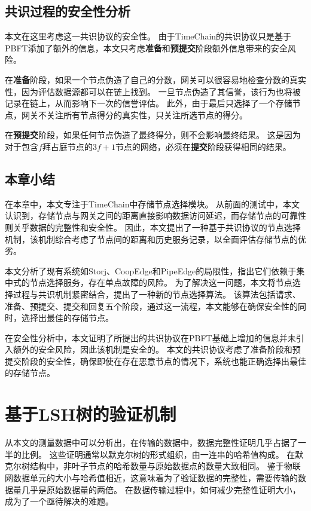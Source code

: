 \section{共识过程的安全性分析}
本文在这里考虑这一共识协议的安全性。
由于TimeChain的共识协议只是基于PBFT添加了额外的信息，本文只考虑\textbf{准备}和\textbf{预提交}阶段额外信息带来的安全风险。

在\textbf{准备}阶段，如果一个节点伪造了自己的分数，网关可以很容易地检查分数的真实性，因为评估数据源都可以在链上找到。
一旦节点伪造了其信誉，该行为也将被记录在链上，从而影响下一次的信誉评估。
此外，由于最后只选择了一个存储节点，网关不关注所有节点得分的真实性，只关注所选节点的得分。

在\textbf{预提交}阶段，如果任何节点伪造了最终得分，则不会影响最终结果。
这是因为对于包含$f$拜占庭节点的$3f+1$节点的网络，必须在\textbf{提交}阶段获得相同的结果。

\section{本章小结}
在本章中，本文专注于TimeChain中存储节点选择模块。
从前面的测试中，本文认识到，存储节点与网关之间的距离直接影响数据访问延迟，而存储节点的可靠性则关乎数据的完整性和安全性。
因此，本文提出了一种基于共识协议的节点选择机制，该机制综合考虑了节点间的距离和历史服务记录，以全面评估存储节点的优劣。

本文分析了现有系统如Storj、CoopEdge和PipeEdge的局限性，指出它们依赖于集中式的节点选择服务，存在单点故障的风险。
为了解决这一问题，本文将节点选择过程与共识机制紧密结合，提出了一种新的节点选择算法。
该算法包括请求、准备、预提交、提交和回复五个阶段，通过这一流程，本文能够在确保安全性的同时，选择出最佳的存储节点。

在安全性分析中，本文证明了所提出的共识协议在PBFT基础上增加的信息并未引入额外的安全风险，因此该机制是安全的。
本文的共识协议考虑了准备阶段和预提交阶段的安全性，确保即使在存在恶意节点的情况下，系统也能正确选择出最佳的存储节点。

\chapter{基于LSH树的验证机制}
\label{sec:lsh}
从本文的测量数据中可以分析出，在传输的数据中，数据完整性证明几乎占据了一半的比例。
这些证明通常以默克尔树的形式组织，由一连串的哈希值构成。
在默克尔树结构中，非叶子节点的哈希数量与原始数据点的数量大致相同。
鉴于物联网数据单元的大小与哈希值相近，这意味着为了验证数据的完整性，需要传输的数据量几乎是原始数据量的两倍。
在数据传输过程中，如何减少完整性证明大小，成为了一个亟待解决的难题。


